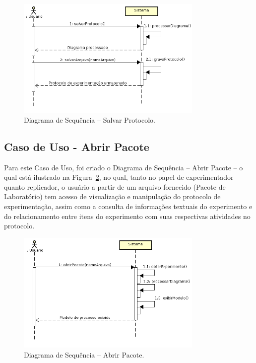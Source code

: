 \begin{figure}[!htb]
\centering
\includegraphics[width=0.8\textwidth]{images/salvarprotocolo.png}
\caption{Diagrama de Sequência -- Salvar Protocolo.}
\label{img:salvarprotocolo}
\end{figure}


\subsection{Caso de Uso - Abrir Pacote}

Para este Caso de Uso, foi criado o Diagrama de Sequência -- Abrir Pacote -- o qual está ilustrado na Figura~\ref{img:abrirpacote}, no qual, tanto no papel de experimentador quanto replicador, o usuário a partir de um arquivo fornecido (Pacote de Laboratório) tem acesso de visualização e manipulação do protocolo de experimentação, assim como a consulta de informações textuais do experimento e do relacionamento entre itens do experimento com suas respectivas atividades no protocolo.

\begin{figure}[!htb]
\centering
\includegraphics[width=0.8\textwidth]{images/abrirpacote.png}
\caption{Diagrama de Sequência -- Abrir Pacote.}
\label{img:abrirpacote}
\end{figure}


